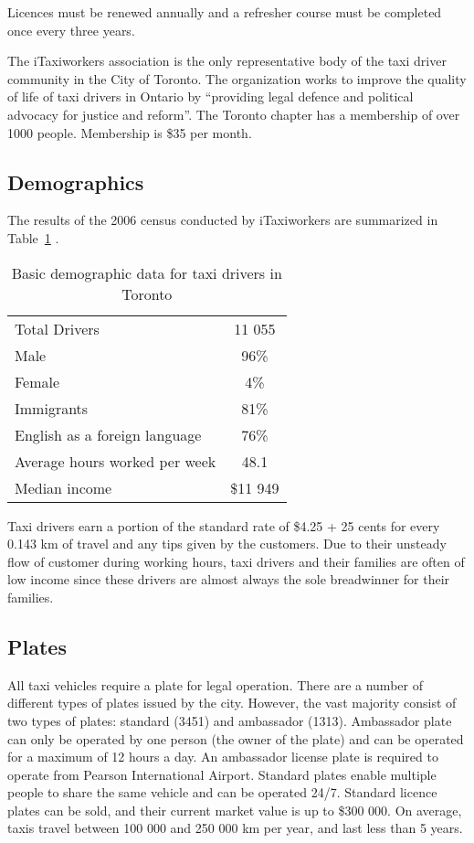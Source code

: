 \documentclass[11pt]{article}
\begin{document}
Licences must be renewed annually %
and a refresher course must be completed once every three years\cite{MLSChp545}.

The iTaxiworkers association is the only representative body of the taxi driver community in the City of Toronto. 
The organization works to improve the quality of life of taxi drivers in Ontario by ``providing legal defence
and political advocacy for justice and reform''\cite{iTaxiWorkers2012}. The Toronto chapter
has a membership of over 1000 people. Membership is \$35 per month\cite{iTaxi2012, Abdiemail}.

\subsection{Demographics}
The results of the 2006 census conducted by iTaxiworkers are summarized in Table~\ref{tab:demographics} \cite{iTaxiWorkers2012}.
\begin{table}[h!]
\centering
\caption{Basic demographic data for taxi drivers in Toronto}
\label{tab:demographics}
\begin{tabular}{l c}
 Total Drivers & 11 055 \\
 Male & 96\% \\
 Female & 4\% \\
 Immigrants & 81\% \\
 English as a foreign language & 76\% \\
 Average hours worked per week & 48.1 \\
 Median income & \$11 949 \\
\end{tabular}
\end{table}

Taxi drivers earn a portion of the standard rate of \$4.25 + 25 cents for every 0.143 km of 
travel\cite{thestar2012} and any tips given by the customers. Due to their unsteady flow of 
customer during working hours, taxi drivers and their families are often of low income since these 
drivers are almost always the sole breadwinner for their families\cite{Abdiphone}.

\subsection{Plates}
All taxi vehicles require a plate for legal operation. There are a number of different types of plates issued by the city. However, the vast majority 
consist of two types of plates: standard (3451) and ambassador (1313)\cite{thestar2012}. 
Ambassador plate can only be operated by one person (the owner of the plate) and can be 
operated for a maximum of 12 hours a day. An ambassador license plate is required to 
operate from Pearson International Airport. Standard plates enable multiple people to share the same vehicle
and can be operated 24/7. Standard licence plates can be sold, and their
current market value is up to \$300 000\cite{thestar2012}. On average, taxis travel between 100 000 and 
250 000 km per year\cite{thestar2012}, and last less than 5 years\cite{thestar2012}. 
\end{document}
